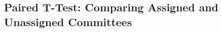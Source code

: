 \documentclass[15pt,letterpaper]{article}
\begin{document}




\subsection{Paired T-Test: Comparing Assigned and Unassigned Committees}
\end{document}
